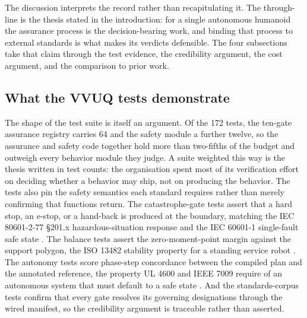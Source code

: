 
The discussion interprets the record rather than recapitulating it. The
through-line is the thesis stated in the introduction: for a single autonomous
humanoid the assurance process is the decision-bearing work, and binding that
process to external standards is what makes its verdicts defensible. The four
subsections take that claim through the test evidence, the credibility argument,
the cost argument, and the comparison to prior work.

\subsection{What the VVUQ tests demonstrate}

The shape of the test suite is itself an argument. Of the 172 tests, the
ten-gate assurance registry carries 64 and the safety module a further twelve, so
the assurance and safety code together hold more than two-fifths of the budget
and outweigh every behavior module they judge. A suite weighted this way is the
thesis written in test counts: the organisation spent most of its verification
effort on deciding whether a behavior may ship, not on producing the behavior.
The tests also pin the safety semantics each standard requires rather than merely
confirming that functions return. The catastrophe-gate tests assert that a hard
stop, an e-stop, or a hand-back is produced at the boundary, matching the IEC
80601-2-77 \S201.x hazardous-situation response and the IEC 60601-1 single-fault
safe state \cite{iec8060127, iec60601}. The balance tests assert the
zero-moment-point margin against the support polygon, the ISO 13482 stability
property for a standing service robot \cite{iso13482}. The autonomy tests score
phase-step concordance between the compiled plan and the annotated reference, the
property UL 4600 and IEEE 7009 require of an autonomous system that must default
to a safe state \cite{ul4600, ieee7009}. And the standards-corpus tests confirm
that every gate resolves its governing designations through the wired manifest,
so the credibility argument is traceable rather than asserted.

